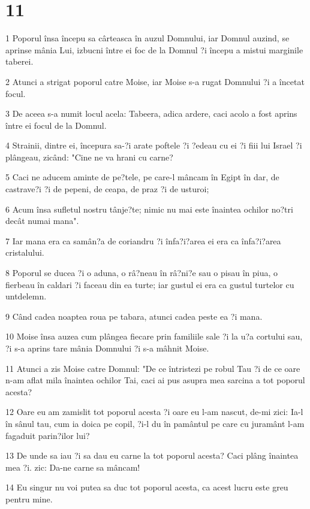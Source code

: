\chapter{11}

\par 1 Poporul însa începu sa cârteasca în auzul Domnului, iar Domnul auzind, se aprinse mânia Lui, izbucni între ei foc de la Domnul ?i începu a mistui marginile taberei.
\par 2 Atunci a strigat poporul catre Moise, iar Moise s-a rugat Domnului ?i a încetat focul.
\par 3 De aceea s-a numit locul acela: Tabeera, adica ardere, caci acolo a fost aprins între ei focul de la Domnul.
\par 4 Strainii, dintre ei, începura sa-?i arate poftele ?i ?edeau cu ei ?i fiii lui Israel ?i plângeau, zicând: "Cine ne va hrani cu carne?
\par 5 Caci ne aducem aminte de pe?tele, pe care-l mâncam în Egipt în dar, de castrave?i ?i de pepeni, de ceapa, de praz ?i de usturoi;
\par 6 Acum însa sufletul nostru tânje?te; nimic nu mai este înaintea ochilor no?tri decât numai mana".
\par 7 Iar mana era ca samân?a de coriandru ?i înfa?i?area ei era ca înfa?i?area cristalului.
\par 8 Poporul se ducea ?i o aduna, o râ?neau în râ?ni?e sau o pisau în piua, o fierbeau în caldari ?i faceau din ea turte; iar gustul ei era ca gustul turtelor cu untdelemn.
\par 9 Când cadea noaptea roua pe tabara, atunci cadea peste ea ?i mana.
\par 10 Moise însa auzea cum plângea fiecare prin familiile sale ?i la u?a cortului sau, ?i s-a aprins tare mânia Domnului ?i s-a mâhnit Moise.
\par 11 Atunci a zis Moise catre Domnul: "De ce întristezi pe robul Tau ?i de ce oare n-am aflat mila înaintea ochilor Tai, caci ai pus asupra mea sarcina a tot poporul acesta?
\par 12 Oare eu am zamislit tot poporul acesta ?i oare eu l-am nascut, de-mi zici: Ia-l în sânul tau, cum ia doica pe copil, ?i-l du în pamântul pe care cu juramânt l-am fagaduit parin?ilor lui?
\par 13 De unde sa iau ?i sa dau eu carne la tot poporul acesta? Caci plâng înaintea mea ?i. zic: Da-ne carne sa mâncam!
\par 14 Eu singur nu voi putea sa duc tot poporul acesta, ca acest lucru este greu pentru mine.
